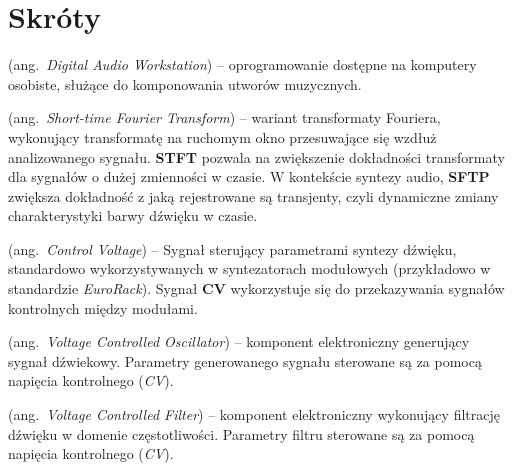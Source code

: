 % 
\chapter*{Skróty}\label{sec:skroty}
\noindent\vspace{-\topsep-\partopsep-\parsep} %
\begin{description}[labelwidth=*]
  \item [DAW] (ang.\ \emph{Digital Audio Workstation}) -- oprogramowanie dostępne na komputery osobiste, służące do komponowania utworów muzycznych.
  \item [STFT] (ang.\ \emph{Short-time Fourier Transform}) -- wariant transformaty Fouriera, wykonujący transformatę na ruchomym okno przesuwające się wzdłuż analizowanego sygnału. \textbf{STFT} pozwala na zwiększenie dokładności transformaty dla sygnałów o dużej zmienności w czasie. W kontekście syntezy audio, \textbf{SFTP} zwiększa dokładność z jaką rejestrowane są transjenty, czyli dynamiczne zmiany charakterystyki barwy dźwięku w czasie.
  \item [CV] (ang.\ \emph{Control Voltage}) -- Sygnał sterujący parametrami syntezy dźwięku, standardowo wykorzystywanych w syntezatorach modułowych (przykładowo w standardzie \textit{EuroRack}). Sygnał \textbf{CV} wykorzystuje się do przekazywania sygnałów kontrolnych między modułami.
  \item [VCO] (ang.\ \emph{Voltage Controlled Oscillator}) -- komponent elektroniczny generujący sygnał dźwiekowy. Parametry generowanego sygnału sterowane są za pomocą napięcia kontrolnego (\textit{CV}).
  \item [VCF] (ang.\ \emph{Voltage Controlled Filter}) -- komponent elektroniczny wykonujący filtrację dźwięku w domenie częstotliwości. Parametry filtru sterowane są za pomocą napięcia kontrolnego (\textit{CV}).
\end{description}
